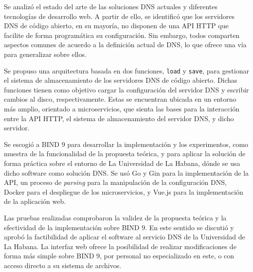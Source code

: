 \begin{conclusions}
Se analizó el estado del arte de las soluciones DNS actuales y diferentes tecnologías de desarrollo web. A partir de ello, se identificó que los servidores DNS de código abierto, en su mayoría, no disponen de una API HTTP que facilite de forma programática su configuración. Sin embargo, todos comparten aspectos comunes de acuerdo a la definición actual de DNS, lo que ofrece una vía para generalizar sobre ellos.

Se propuso una arquitectura basada en dos funciones, \verb|load| y \verb|save|, para gestionar el sistema de almacenamiento de los servidores DNS de código abierto. Dichas funciones tienen como objetivo cargar la configuración del servidor DNS y escribir cambios al disco, respectivamente. Estas se encuentran ubicada en un entorno más amplio, orientado a microservicios, que sienta las bases para la interacción entre la API HTTP, el sistema de almacenamiento del servidor DNS, y dicho servidor.

Se escogió a BIND 9 para desarrollar la implementación y los experimentos, como muestra de la funcionalidad de la propuesta teórica, y para aplicar la solución de forma práctica sobre el entorno de La Universidad de La Habana, dónde se usa dicho software como solución DNS. Se usó Go y Gin para la implementación de la API, un proceso de \textit{parsing} para la manipulación de la configuración DNS, Docker para el despliegue de los microservicios, y Vue.js para la implementación de la aplicación web.

Las pruebas realizadas comprobaron la validez de la propuesta teórica y la efectividad de la implementación sobre BIND 9. En este sentido se discutió y aprobó la factibilidad de aplicar el software al servicio DNS de la Universidad de La Habana. La interfaz web ofrece la posibilidad de realizar modificaciones de forma más simple sobre BIND 9, por personal no especializado en este, o con acceso directo a su sistema de archivos.
\end{conclusions}
